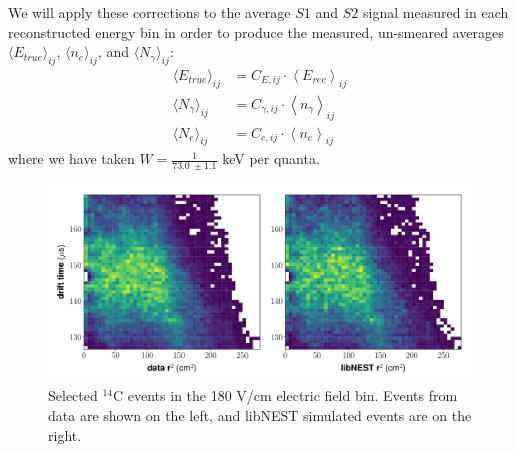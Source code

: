 We will apply these corrections to the average $S1$ and $S2$ signal measured in each reconstructed energy bin in order to produce the measured, un-smeared averages $\langle E_{true} \rangle_{ij}$, $\langle n_{e} \rangle_{ij}$, and $\langle N_{\gamma} \rangle_{ij}$:
\begin{align}
\label{eq:datEtrue}\langle E_{true} \rangle_{ij}&=C_{E,ij} \cdot \left\langle E_{rec} \right\rangle_{ij} \\[1em]
\label{eq:datNytrue}\langle N_{\gamma} \rangle_{ij}&=C_{\gamma,ij} \cdot \left\langle n_{\gamma}\right\rangle_{ij} \\[1em]
\label{eq:datNetrue}\langle N_{e} \rangle_{ij}&= C_{e,ij} \cdot \left\langle n_e\right\rangle_{ij}
\end{align}
where we have taken $W=\frac{1}{73.0 \ \pm 1.1}$ keV per quanta. 
\begin{figure}[h!]
\centering
\includegraphics[width=\textwidth]{Figures/yields_corrections/C14_eFcut_gfdcm_180Vcm_prelim.pdf}
\caption{Selected $^{14}$C events in the 180 V/cm electric field bin. Events from data are shown on the left, and libNEST simulated events are on the right. }
\label{fig:efcut_180vcm}
\end{figure}


